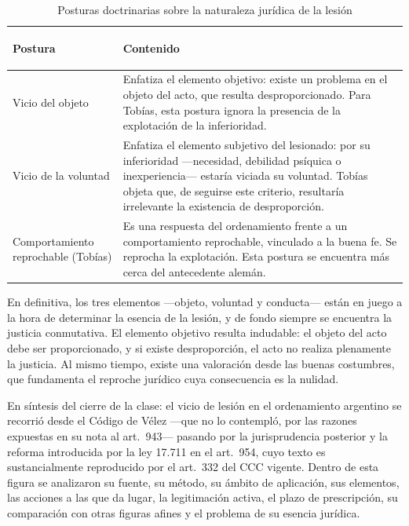\documentclass[12pt,oneside]{book}
\begin{document}
\begin{table}[H]
\centering
\caption{Posturas doctrinarias sobre la naturaleza jurídica de la lesión}
\begin{tabularx}{\textwidth}{>{\bfseries\raggedright\arraybackslash}p{} X}
\toprule
\textbf{Postura} & \textbf{Contenido} \\
\midrule
Vicio del objeto & Enfatiza el elemento objetivo: existe un problema en el objeto del acto, que resulta desproporcionado. Para Tobías, esta postura ignora la presencia de la explotación de la inferioridad. \\
Vicio de la voluntad & Enfatiza el elemento subjetivo del lesionado: por su inferioridad —necesidad, debilidad psíquica o inexperiencia— estaría viciada su voluntad. Tobías objeta que, de seguirse este criterio, resultaría irrelevante la existencia de desproporción. \\
Comportamiento reprochable (Tobías) & Es una respuesta del ordenamiento frente a un comportamiento reprochable, vinculado a la buena fe. Se reprocha la explotación. Esta postura se encuentra más cerca del antecedente alemán. \\
\bottomrule
\end{tabularx}
\end{table}

En definitiva, los tres elementos —objeto, voluntad y conducta— están en juego a la hora de determinar la esencia de la lesión, y de fondo siempre se encuentra la justicia conmutativa. El elemento objetivo resulta indudable: el objeto del acto debe ser proporcionado, y si existe desproporción, el acto no realiza plenamente la justicia. Al mismo tiempo, existe una valoración desde las buenas costumbres, que fundamenta el reproche jurídico cuya consecuencia es la nulidad.

\begin{note}
En síntesis del cierre de la clase: el vicio de lesión en el ordenamiento argentino se recorrió desde el Código de Vélez —que no lo contempló, por las razones expuestas en su nota al art.\ 943— pasando por la jurisprudencia posterior y la reforma introducida por la ley 17.711 en el art.\ 954, cuyo texto es sustancialmente reproducido por el art.\ 332 del CCC vigente. Dentro de esta figura se analizaron su fuente, su método, su ámbito de aplicación, sus elementos, las acciones a las que da lugar, la legitimación activa, el plazo de prescripción, su comparación con otras figuras afines y el problema de su esencia jurídica.
\end{note}
\end{document}
